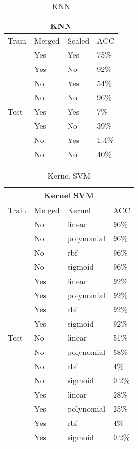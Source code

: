 \documentclass[17pt]{article}
\begin{document}
\begin{table}[]
	\caption{KNN}
	\centering
	\label{KNNTable}
	\begin{tabular}{|l|l|l|l|}
		\hline
		\multicolumn{4}{|c|}{KNN}\\
		\cline{1-4}
		\hline
		Train & Merged & Scaled & ACC \\
		\cline{2-4}
		&    Yes      &   Yes    & 75\%  \\
		\cline{2-4}
		&    Yes      &   No     & 92\% \\
		\cline{2-4}
		& No & Yes & 54\% \\
		\cline{2-4}
		& No & No & 96\%\\
		\hline
		
		Test & Yes & Yes & 7\% \\
		\cline{2-4}
		&    Yes      &   No     & 39\%\\
		\cline{2-4}
		& No & Yes & 1.4\% \\
		\cline{2-4}
		& No & No & 40\%\\
		\hline
	\end{tabular}
\end{table}

\begin{table}[]
	\caption{Kernel SVM}
	\centering
	\label{SVMTable}
	\begin{tabular}{|l|l|l|l|}
		\hline
		\multicolumn{4}{|c|}{Kernel SVM}\\
		\cline{1-4}
		\hline
		Train & Merged & Kernel & ACC \\
		\cline{2-4}
		&    No      &   linear    & 96\%  \\
		\cline{2-4}
		&    No      &   polynomial     & 96\% \\
		\cline{2-4}
     	&    No      &   rbf     & 96\%\\
        \cline{2-4}
		&    No      &   sigmoid     & 96\%\\
		\cline{2-4}
		&    Yes      &   linear    & 92\%  \\
		\cline{2-4}
		&    Yes      &   polynomial     & 92\% \\
		\cline{2-4}
		&    Yes      &   rbf     & 92\%\\
		\cline{2-4}
		&    Yes      &   sigmoid     & 92\%\\
		\hline
		Test &    No      &   linear    & 51\%  \\
		\cline{2-4}
		&    No      &   polynomial     & 58\% \\
		\cline{2-4}
		&    No      &   rbf     & 4\%\\
		\cline{2-4}
		&    No      &   sigmoid     & 0.2\%\\
         \cline{2-4}
         &    Yes      &   linear    & 28\%  \\
        \cline{2-4}
        &    Yes      &   polynomial     & 25\% \\
        \cline{2-4}
        &    Yes      &   rbf     & 4\%\\
        \cline{2-4}
        &    Yes      &   sigmoid     & 0.2\%\\
		\hline
	\end{tabular}
\end{table}
\end{document}

